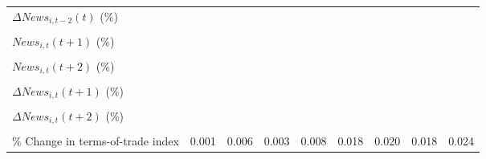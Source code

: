 {\begin{tabular}{l*{8}{c}}
\addlinespace
$ \Delta News_{i,t-2}(t)$ (\%)&                     &                     &                     &                     &                     &                     &                     &                     \\
                    &                     &                     &                     &                     &                     &                     &                     &                     \\
\addlinespace
$ News_{i,t}(t+1)$ (\%)&                     &                     &                     &                     &                     &                     &                     &                     \\
                    &                     &                     &                     &                     &                     &                     &                     &                     \\
\addlinespace
$ News_{i,t}(t+2)$ (\%)&                     &                     &                     &                     &                     &                     &                     &                     \\
                    &                     &                     &                     &                     &                     &                     &                     &                     \\
\addlinespace
$ \Delta News_{i,t}(t+1)$ (\%)&                     &                     &                     &                     &                     &                     &                     &                     \\
                    &                     &                     &                     &                     &                     &                     &                     &                     \\
\addlinespace
$ \Delta News_{i,t}(t+2)$ (\%)&                     &                     &                     &                     &                     &                     &                     &                     \\
                    &                     &                     &                     &                     &                     &                     &                     &                     \\
\addlinespace
\% Change in terms-of-trade index&       0.001         &       0.006         &       0.003         &       0.008         &       0.018         &       0.020         &       0.018         &       0.024         \\

\end{tabular}}
